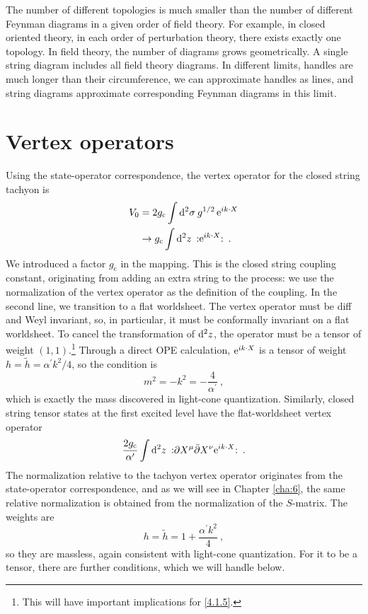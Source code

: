 The number of different topologies is much smaller than the number of different Feynman diagrams in a given order of field theory. For example, in closed oriented theory, in each order of perturbation theory, there exists exactly one topology. In field theory, the number of diagrams grows geometrically. A single string diagram includes all field theory diagrams. In different limits, handles are much longer than their circumference, we can approximate handles as lines, and string diagrams approximate corresponding Feynman diagrams in this limit.    

\section{\texorpdfstring{Vertex operators}{3.6 Vertex operators}} \label{sec:3.6}

Using the state-operator correspondence, the vertex operator for the closed string tachyon is    
\begin{align}
	V_{0} &=2 g_{\mathrm{c}} \int \mathrm{d}^{2} \sigma \: g^{1 / 2} \,\mathrm{e}^{i k \cdot X}  \nonumber \\
	& \rightarrow g_{\mathrm{c}} \int \mathrm{d}^{2} z\: : \mathrel{\mathrm{e}^{i k \cdot X}}: \:.
	\label{3.6.1} \end{align}
We introduced a factor $g_{\mathrm{c}}$ in the mapping. This is the closed string coupling constant, originating from adding an extra string to the process: we use the normalization of the vertex operator as the definition of the coupling. In the second line, we transition to a flat worldsheet. The vertex operator must be diff and Weyl invariant, so, in particular, it must be conformally invariant on a flat worldsheet. To cancel the transformation of $\mathrm{d}^2 z$, the operator must be a tensor of weight $(1,1)$.\footnote{This will have important implications for \eqref{4.1.5}.}
Through a direct OPE calculation, $\mathrm{e}^{i k \cdot X}$ is a tensor of weight $h=\tilde{h}=\alpha^{\prime} k^{2} / 4$, so the condition is    
\begin{equation}
	m^{2}=-k^{2}=-\frac{4}{\alpha^{\prime}} \:, \label{3.6.2}
\end{equation}
which is exactly the mass discovered in light-cone quantization.    
Similarly, closed string tensor states at the first excited level have the flat-worldsheet vertex operator    
\begin{equation}
	\frac{2 g_{\mathrm{c}}}{\alpha^{\prime}} \int \mathrm{d}^{2} z\: : \mathrel{\partial X^{\mu} \bar{\partial} X^{\nu} \mathrm{e}^{i k \cdot X}}: \:. \label{3.6.3}
\end{equation}
The normalization relative to the tachyon vertex operator originates from the state-operator correspondence, and as we will see in Chapter \ref{cha:6}, the same relative normalization is obtained from the normalization of the $S$-matrix.    
The weights are    
\begin{equation}
	h=\tilde{h}=1+\frac{\alpha^{\prime} k^{2}}{4} \:, \label{3.6.4}
\end{equation}
so they are massless, again consistent with light-cone quantization. For it to be a tensor, there are further conditions, which we will handle below.    
